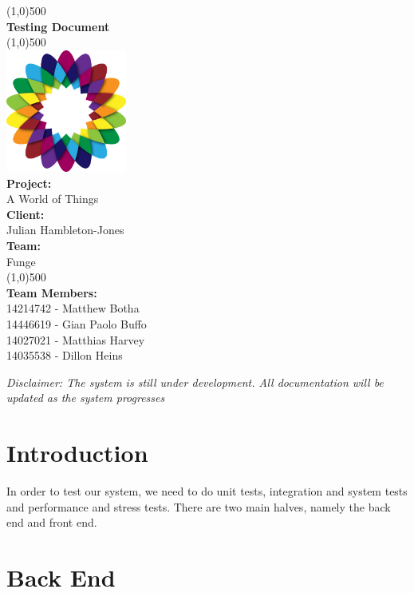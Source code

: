 \documentclass{article}
\begin{document}
\begin{titlepage}
	\begin{center}
		\line(1,0){500}\\
		[6mm]
		\huge{\bfseries Testing Document}\\
		\line(1,0){500}\\
		[5mm]
		\includegraphics[width=150px]{../images/AWorldOfPlants.png}
		\\
		[5mm]
		\large\textbf{Project:}\\A World of Things\\
		[3mm]
		\large\textbf{Client:}\\Julian Hambleton-Jones\\
		[3mm]
		\large \textbf{Team:}\\Funge\\
		\line(1,0){500}\\
		[5mm]
		\large \textbf{Team Members:}\\
		[3mm]
		\large 14214742 - Matthew Botha\\
		\large 14446619 - Gian Paolo Buffo\\
		\large 14027021 - Matthias Harvey\\
        \large 14035538 - Dillon Heins\\[3mm]
	\end{center}
\end{titlepage}

\cleardoublepage
\thispagestyle{empty}
\tableofcontents
\cleardoublepage
\setcounter{page}{1}

\textit{Disclaimer: The system is still under development. All documentation will be updated as the system progresses}

\section{Introduction}
	In order to test our system, we need to do unit tests, integration and system tests and performance and stress tests. There are two main halves, namely the back end and front end.

\section{Back End}
\end{document}

